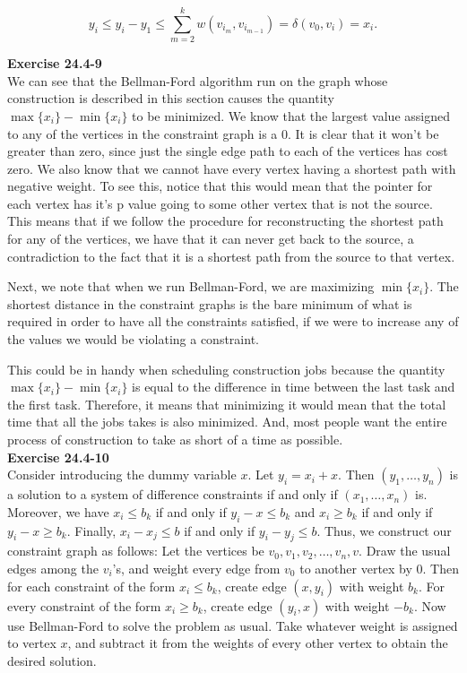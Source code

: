 \documentclass{article}
\begin{document}
\[ y_i \leq y_i - y_1 \leq \sum_{m=2}^k w(v_{i_m}, v_{i_{m-1}}) = \delta(v_0, v_i) = x_i.\]

\noindent\textbf{Exercise 24.4-9}\\

We can see that the Bellman-Ford algorithm run on the graph whose construction is described in this section causes the quantity $\max\{x_i\} - \min\{x_i\}$ to be minimized. We know that the largest value assigned to any of the vertices in the constraint graph is a 0. It is clear that it won't be greater than zero, since just the single edge path to each of the vertices has cost zero. We also know that we cannot have every vertex having a shortest path with negative weight. To see this, notice that this would mean that the pointer for each vertex has it's p value going to some other vertex that is not the source. This means that if we follow the procedure for reconstructing the shortest path for any of the vertices, we have that it can never get back to the source, a contradiction to the fact that it is a shortest path from the source to that vertex.

Next, we note that when we run Bellman-Ford, we are maximizing $\min\{x_i\}$. The shortest distance in the constraint graphs is the bare minimum of what is required in order to have all the constraints satisfied, if we were to increase any of the values we would be violating a constraint.

This could be in handy when scheduling construction jobs because the quantity $\max\{x_i\} - \min\{x_i\}$ is equal to the difference in time between the last task and the first task. Therefore, it means that minimizing it would mean that the total time that all the jobs takes is also minimized. And, most people want the entire process of construction to take as short of a time as possible.\\

\noindent\textbf{Exercise 24.4-10}\\

Consider introducing the dummy variable $x$.  Let $y_i = x_i + x$.  Then $(y_1, \ldots, y_n)$ is a solution to a system of difference constraints if and only if $(x_1, \ldots, x_n)$ is.  Moreover, we have $x_i \leq b_k$ if and only if $y_i - x \leq b_k$ and $x_i \geq b_k$ if and only if $y_i - x \geq b_k$.  Finally, $x_i - x_j \leq b$ if and only if $y_i - y_j \leq b$.  Thus, we construct our constraint graph as follows:  Let the vertices be $v_0, v_1, v_2, \ldots, v_n, v$.  Draw the usual edges among the $v_i$'s, and weight every edge from $v_0$ to another vertex by 0.  Then for each constraint of the form $x_i \leq b_k$, create edge $(x,y_i)$ with weight $b_k$.  For every constraint of the form $x_i \geq b_k$, create edge $(y_i, x)$ with weight $-b_k$.  Now use Bellman-Ford to solve the problem as usual.  Take whatever weight is assigned to vertex $x$, and subtract it from the weights of every other vertex to obtain the desired solution. \\
\end{document}
